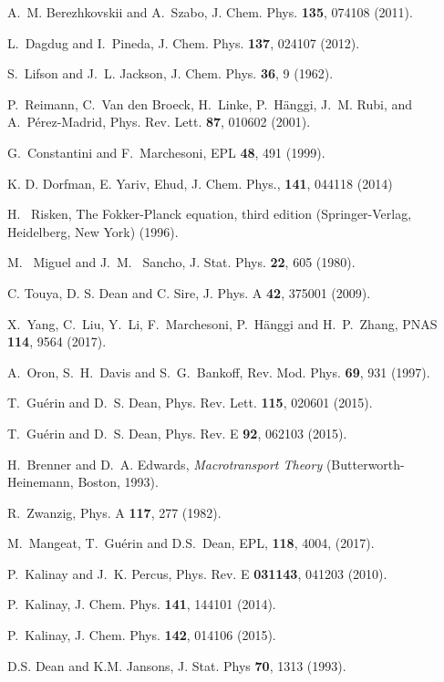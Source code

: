 \documentclass[pre,showpacs,preprintnumbers,amsmath,amssymb,superscriptaddress]{revtex4-1}
\begin{document}
{{\begin{thebibliography}{10}
 A.~M. Berezhkovskii and A.~Szabo, J. Chem. Phys. {\bf 135}, 074108 (2011).

 L.~Dagdug and I.~Pineda, J. Chem. Phys. {\bf 137}, 024107 (2012).

 S.~Lifson and J.~L. Jackson, J. Chem. Phys. {\bf 36}, 9 (1962).

 P.~Reimann, C.~{Van den Broeck}, H.~Linke, P.~H{\"a}nggi, J.~M. Rubi, and A.~P{\'e}rez-Madrid, Phys. Rev. Lett. {\bf 87}, 010602 (2001).

 G.~Constantini and F.~Marchesoni, EPL {\bf 48}, 491 (1999).

 K. D.  Dorfman, E. Yariv, Ehud, J. Chem. Phys., {\bf 141}, 044118 (2014)

 H.~ Risken, The Fokker-Planck equation, third edition (Springer-Verlag, Heidelberg, New York) (1996).

 M.~ Miguel and J.~M.~ Sancho, J. Stat. Phys. {\bf 22}, 605 (1980).

 C. Touya, D. S. Dean and C. Sire, J. Phys. A {\bf 42}, 375001 (2009).

 X.~Yang, C.~Liu, Y.~Li, F.~Marchesoni, P.~H\"anggi and H.~P.~Zhang, PNAS {\bf 114}, 9564 (2017).

A.~Oron, S.~H.~Davis and S.~G.~Bankoff,  Rev. Mod. Phys.
{\bf 69}, 931 (1997).

 T.~Gu{\'e}rin and D.~S. Dean, Phys. Rev. Lett. {\bf 115}, 020601 (2015).

 T.~Gu{\'e}rin and D.~S. Dean, Phys. Rev. E {\bf 92}, 062103 (2015).

 H.~Brenner and D.~A. Edwards, {\it Macrotransport Theory} (Butterworth-Heinemann, Boston, 1993).

 R.~Zwanzig, Phys. A {\bf 117}, 277 (1982).

 M.~Mangeat, T.~Gu\'erin and D.S.~Dean, EPL, {\bf 118}, 4004, (2017).

 P.~Kalinay and J.~K. Percus, Phys. Rev. E {\bf 031143}, 041203 (2010).

 P.~Kalinay, J. Chem. Phys. {\bf 141}, 144101 (2014).

 P.~Kalinay, J. Chem. Phys. {\bf 142}, 014106 (2015).

 D.S. Dean and K.M. Jansons, J. Stat. Phys {\bf 70}, 1313 (1993).


\end{thebibliography}}}
\end{document}
